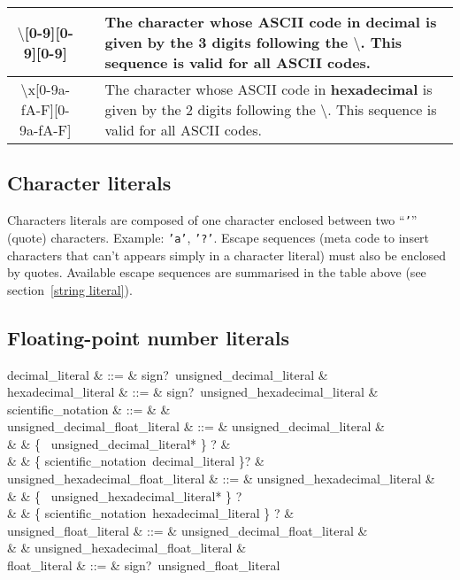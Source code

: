 \begin{tabular}{|c|c|p{7cm}|}
  \hline
  $\setminus$[0-9][0-9][0-9] & & The character whose ASCII code in
                                {\bf decimal} is given by the 3 digits
                                following the $\setminus$. This
                                sequence is valid for all
                                ASCII codes. \\
  \hline
  $\setminus$x[0-9a-fA-F][0-9a-fA-F] & & The character whose ASCII code in
                                {\bf hexadecimal} is given by the 2
                                digits following the $\setminus$. This
                                sequence is valid for all
                                ASCII codes.\\
  \hline
\end{tabular}

\subsection{Character literals}
\label{character literals}
\label{hexadecimal}
Characters literals are composed of one character enclosed between two
``{\tt '}'' (quote) characters. Example: {\tt 'a'}, {\tt '?'}.
Escape sequences (meta code to insert characters that can't appears
simply in a character literal) must also be enclosed by
quotes. Available escape sequences are summarised in the table above
(see section~\ref{string literal}).

\subsection{Floating-point number literals}
\begin{syntax}
decimal\_literal & ::= & sign?\ unsigned\_decimal\_literal & \\
hexadecimal\_literal & ::= & sign?\ unsigned\_hexadecimal\_literal & \\
scientific\_notation & ::= &  \mid {} & \\
unsigned\_decimal\_float\_literal & ::= & unsigned\_decimal\_literal & \\
& &  \{ \ unsigned\_decimal\_literal* \} ? & \\
& &  \{ scientific\_notation\ decimal\_literal \}? & \\
unsigned\_hexadecimal\_float\_literal & ::= & unsigned\_hexadecimal\_literal &\\
& & \{ \ unsigned\_hexadecimal\_literal* \} ? \\
& & \{ scientific\_notation\ hexadecimal\_literal \} ? & \\
unsigned\_float\_literal & ::= & unsigned\_decimal\_float\_literal & \\
& & \mid unsigned\_hexadecimal\_float\_literal & \\
float\_literal & ::= & sign?\ unsigned\_float\_literal
\end{syntax}

